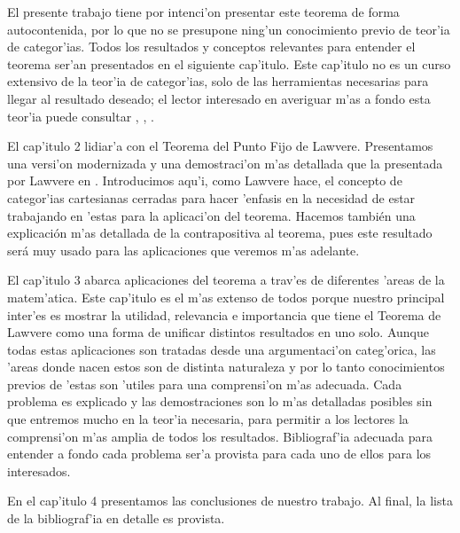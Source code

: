 El presente trabajo tiene por intenci'on presentar este teorema de forma autocontenida, por lo que no se presupone ning'un conocimiento previo de teor'ia de categor'ias. Todos los resultados y conceptos relevantes para entender el teorema ser'an presentados en el siguiente cap'itulo. Este cap'itulo no es un curso extensivo de la teor'ia de categor'ias, solo de las herramientas necesarias para llegar al resultado deseado; el lector interesado en averiguar m'as a fondo esta teor'ia puede consultar \parencite{riehl}, \parencite{leinster}, \parencite{maclane}.

El cap'itulo 2 lidiar'a con el Teorema del Punto Fijo de Lawvere. Presentamos una versi'on modernizada y una demostraci'on m'as detallada que la presentada por Lawvere en \parencite{lawverefixed}. Introducimos aqu'i, como Lawvere hace, el concepto de categor'ias cartesianas cerradas para hacer 'enfasis en la necesidad de estar trabajando en 'estas para la aplicaci'on del teorema. Hacemos también una explicación m'as detallada de la contrapositiva al teorema, pues este resultado será muy usado para las aplicaciones que veremos m'as adelante. 

El cap'itulo 3 abarca aplicaciones del teorema a trav'es de diferentes 'areas de la matem'atica. Este cap'itulo es el m'as extenso de todos porque nuestro principal inter'es es mostrar la utilidad, relevancia e importancia que tiene el Teorema de Lawvere como una forma de unificar distintos resultados en uno solo. Aunque todas estas aplicaciones son tratadas desde una argumentaci'on categ'orica, las 'areas donde nacen estos son de distinta naturaleza y por lo tanto conocimientos previos de 'estas son 'utiles para una comprensi'on m'as adecuada. Cada problema es explicado y las demostraciones son lo m'as detalladas posibles sin que entremos mucho en la teor'ia necesaria, para permitir a los lectores la comprensi'on m'as amplia de todos los resultados. Bibliograf'ia adecuada para entender a fondo cada problema ser'a provista para cada uno de ellos para los interesados. 

En el cap'itulo 4 presentamos las conclusiones de nuestro trabajo. Al final, la lista de la bibliograf'ia en detalle es provista. 


